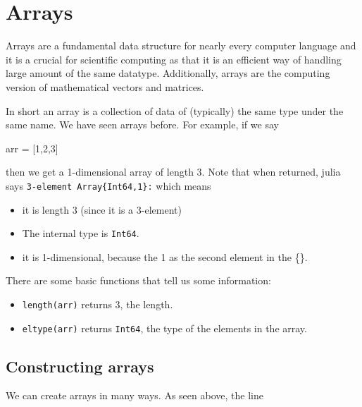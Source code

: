 

\hypertarget{ch:arrays}{%
\chapter{Arrays}\label{ch:arrays}}


Arrays are a fundamental data structure for nearly every computer
language and it is a crucial for scientific computing as that it is an efficient way of handling large amount of the same datatype.  Additionally, arrays are the computing version of mathematical vectors and matrices. 


In short an array is a collection of data of (typically) the same type
under the same name. We have seen arrays before. For example, if we say
%
\begin{jlblock}[array]
arr = [1,2,3]
\end{jlblock}
then we get a 1-dimensional array of length 3. Note that when returned,
julia says \texttt{3-element\ Array\{Int64,1\}:} which means

\begin{itemize}
\item  it is length 3 (since it is a 3-element)
\item  The internal type is \verb!Int64!.
\item  it is 1-dimensional, because the 1 as the second element in the \{\}.
\end{itemize}

There are some basic functions that tell us some information:
%
\begin{itemize}
\item \texttt{length(arr)} returns 3, the length.
\item \texttt{eltype(arr)} returns \texttt{Int64}, the type of the elements in the array.
\end{itemize}

\hypertarget{constructing-arrays}{%
\section{Constructing arrays}\label{constructing-arrays}}

We can create arrays in many ways. As seen above, the line

